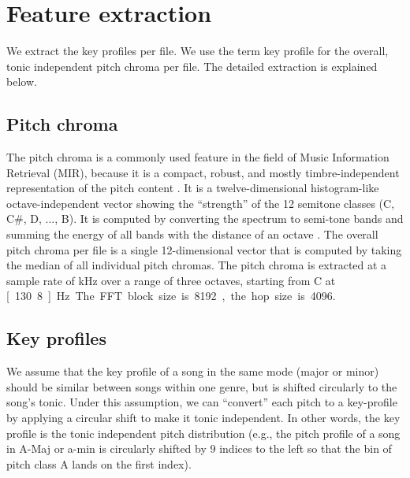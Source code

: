 \documentclass{article}
\begin{document}
\section{Feature extraction}\label{sec:pitch_chroma}
We extract the key profiles per file. We use the term key profile for the overall, tonic independent pitch chroma per file. The detailed extraction is explained below.

\subsection{Pitch chroma}\label{subsec:pc_extract}
The pitch chroma is a commonly used feature in the field of Music Information Retrieval (MIR), because it is a compact, robust, and mostly timbre-independent representation of the pitch content  \cite{muller_information_2007}. It is a twelve-dimensional histogram-like octave-independent vector showing the ``strength'' of the 12 semitone classes (C, C\#, D, ..., B). It is computed by converting the spectrum to semi-tone bands and summing the energy of all bands with the distance of an octave \cite{fujishima_realtime_1999}. 
The overall pitch chroma per file is a single 12-dimensional vector that is computed by taking the median of all individual pitch chromas. 
The pitch chroma is extracted at a sample rate of \unit[10]{kHz} over a range of three octaves, starting from C at \unit[130.8]{Hz}. The FFT block size is 8192, the hop size is 4096.



\subsection{Key profiles}\label{sec:featureset}
We assume that the key profile of a song in the same mode (major or minor) should be similar between songs within one genre, but is shifted circularly to the song's tonic. Under this assumption, we can ``convert'' each pitch to a key-profile by applying a circular shift to make it tonic independent. In other words, the key profile is the tonic independent pitch distribution (e.g., the pitch profile of a song in A-Maj or a-min is circularly shifted by $9$ indices to the left so that the bin of pitch class A lands on the first index).
\end{document}
